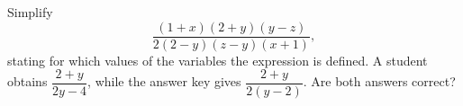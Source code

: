Simplify
\[
\dfrac{(1+x)(2+y)(y-z)}{2(2-y)(z-y)(x+1)},
\]
stating for which values of the variables the expression is defined. A student obtains $\dfrac{2+y}{2y-4}$, while the answer key gives $\dfrac{2+y}{2(y-2)}$. Are both answers correct?
